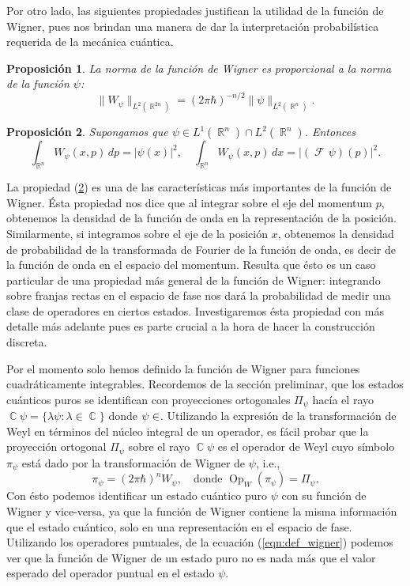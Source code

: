 \documentclass[a4paper]{report}
\DeclareMathOperator{\R}{\mathbb{R}}
\DeclareMathOperator{\C}{\mathbb{C}}
\let\H\relax
\DeclareMathOperator{\H}{\mathcal H}
\DeclareMathOperator{\Op}{Op}
\DeclareMathOperator{\Fr}{\mathcal{F}\!}
\newtheorem{proposition}{Proposición}
\begin{document}
  Por otro lado, las siguientes propiedades justifican la
  utilidad de la función de Wigner, pues nos brindan una
  manera de dar la interpretación probabilística requerida
  de la mecánica cuántica.
  \begin{proposition}
    \label{prop:wigner_bound}
    La norma de la función de Wigner es proporcional a la
    norma de la función $\psi$:
    \begin{equation}
      \|W_\psi\|_{L^2(\R^{2n})}
      = (2\pi\hbar)^{-n / 2} \|\psi\|_{L^2(\R^{n})}.
    \end{equation}
  \end{proposition}
  \begin{proposition}
    \label{prop:wigner_marginal}
    Supongamos que $\psi \in L^{1}(\R^{n}) \cap
    L^2(\R^{n})$. Entonces
    \begin{equation}
      \int_{\R^{n}} W_\psi(x,p) \, dp
      = |\psi(x)|^2,
      \quad
      \int_{\R^{n}} W_\psi(x,p) \, dx
      = |(\Fr\psi)(p)|^2.
    \end{equation}
  \end{proposition}
  La propiedad (\ref{prop:wigner_marginal}) es una de las
  características más importantes de la función de Wigner.
  Ésta propiedad nos dice que al integrar sobre el eje del
  momentum $p$, obtenemos la densidad de la función de onda
  en la representación de la posición. Similarmente, si
  integramos sobre el eje de la posición $x$, obtenemos la
  densidad de probabilidad de la transformada de Fourier de
  la función de onda, es decir de la función de onda en el
  espacio del momentum. Resulta que ésto es un caso
  particular de una propiedad más general de la función de
  Wigner: integrando sobre franjas rectas en el espacio de
  fase nos dará la probabilidad de medir una clase de
  operadores en ciertos estados. Investigaremos ésta
  propiedad con más detalle más adelante pues es parte
  crucial a la hora de hacer la construcción discreta.

  Por el momento solo hemos definido la función de Wigner
  para funciones cuadráticamente integrables. Recordemos de
  la sección preliminar, que los estados cuánticos puros se
  identifican con proyecciones ortogonales $\Pi_\psi$ hacía
  el rayo $\C \psi = \{\lambda \psi : \lambda \in \C\}$
  donde $\psi \in \H$.  Utilizando la expresión de la
  transformación de Weyl en términos del núcleo integral de
  un operador, es fácil probar que la proyección ortogonal
  $\Pi_\psi$ sobre el rayo $\C\psi$ es el operador de Weyl
  cuyo símbolo $\pi_\psi$ está dado por la transformación de
  Wigner de $\psi$, i.e.,
  \begin{equation}
    \pi_\psi = (2\pi\hbar)^{n}W_\psi,
    \quad \text{donde }
    \Op_W(\pi_\psi) = \Pi_\psi.
  \end{equation} 
  Con ésto podemos identificar un estado cuántico puro
  $\psi$ con su función de Wigner y vice-versa, ya que la
  función de Wigner contiene la misma información que el
  estado cuántico, solo en una representación en el espacio
  de fase. Utilizando los operadores puntuales, de la
  ecuación (\ref{eqn:def_wigner}) podemos ver que la función
  de Wigner de un estado puro no es nada más que el valor
  esperado del operador puntual en el estado $\psi$.
\end{document}
